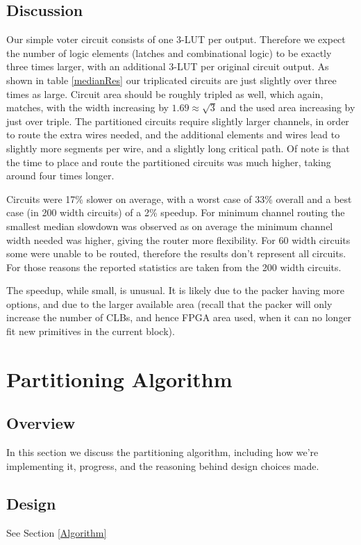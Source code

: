 \documentclass[12pt,drafta4paper,oneside]{memoir} %
\begin{document}
\section{Discussion}
Our simple voter circuit consists of one 3-\ac{LUT} per output. Therefore we expect the number of logic elements (latches and combinational logic) to be exactly three times larger, with an additional 3-\ac{LUT} per original circuit output. As shown in table \ref{medianRes} our triplicated circuits are just slightly over three times as large. Circuit area should be roughly tripled as well, which again, matches, with the width increasing by $1.69 \approx \sqrt{3}$ and the used area increasing by just over triple. The partitioned circuits require slightly larger channels, in order to route the extra wires needed, and the additional elements and wires lead to slightly more segments per wire, and a slightly long critical path. Of note is that the time to place and route the partitioned circuits was much higher, taking around four times longer.

Circuits were 17\% slower on average, with a worst case of 33\% overall and a best case (in 200 width circuits) of a 2\% speedup. For minimum channel routing the smallest median slowdown was observed as on average the minimum channel width needed was higher, giving the router more flexibility. For 60 width circuits some were unable to be routed, therefore the results don't represent all circuits. For those reasons the reported statistics are taken from the 200 width circuits.

The speedup, while small, is unusual. It is likely due to the packer having more options, and due to the larger available area (recall that the packer will only increase the number of \acp{CLB}, and hence \ac{FPGA} area used, when it can no longer fit new primitives in the current block).


\chapter{Partitioning Algorithm}
\section{Overview}
In this section we discuss the partitioning algorithm, including how we're implementing it, progress, and the reasoning behind design choices made.
\section{Design}
See Section \ref{Algorithm}
\end{document}
